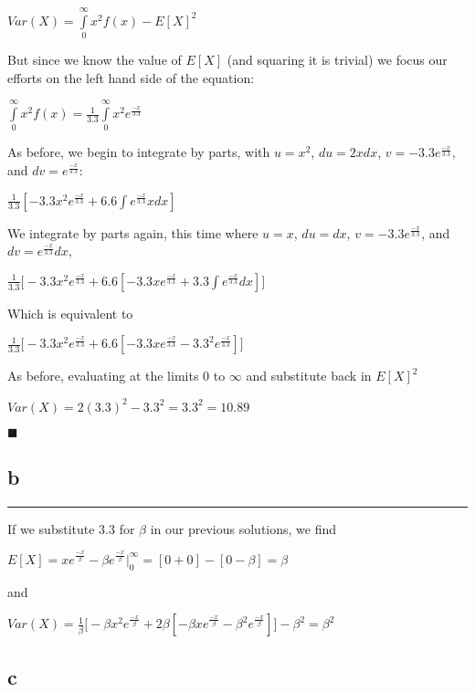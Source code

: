 \documentclass[]{tufte-handout}
\begin{document}
\(Var(X) = \int\limits^\infty_{0}x^2f(x) - E[X]^2\)

But since we know the value of \(E[X]\) (and squaring it is trivial) we
focus our efforts on the left hand side of the equation:

\(\int\limits^\infty_{0}x^2f(x) = \frac{1}{3.3}\int\limits^\infty_{0}x^2e^{\frac{-x}{3.3}}\)

As before, we begin to integrate by parts, with \(u = x^2\),
\(du = 2xdx\), \(v = -3.3e^{\frac{-x}{3.3}}\), and
\(dv = e^{\frac{-x}{3.3}}\):

\(\frac{1}{3.3}[-3.3x^2e^{\frac{-x}{3.3}}+6.6\int e^{\frac{-x}{3.3}}xdx]\)

We integrate by parts again, this time where \(u = x\), \(du = dx\),
\(v = -3.3e^{\frac{-x}{3.3}}\), and \(dv = e^{\frac{-x}{3.3}}dx\),

\(\frac{1}{3.3}\Big[-3.3x^2e^{\frac{-x}{3.3}}+6.6[-3.3xe^{\frac{-x}{3.3}} + 3.3 \int e^{\frac{-x}{3.3}}dx]\Big]\)

Which is equivalent to

\(\frac{1}{3.3}\Big[-3.3x^2e^{\frac{-x}{3.3}}+6.6[-3.3xe^{\frac{-x}{3.3}} - 3.3^2 e^{\frac{-x}{3.3}}]\Big]\)

As before, evaluating at the limits \(0\) to \(\infty\) and substitute
back in \(E[X]^2\)

\(Var(X) = 2(3.3)^2-3.3^2 = 3.3^2 = 10.89\)

\begin{marginfigure}
\(\blacksquare\)
\end{marginfigure}

\hypertarget{b-2}{%
\subsection{b}\label{b-2}}

\begin{center}\rule{0.5\linewidth}{0.5pt}\end{center}

If we substitute \(3.3\) for \(\beta\) in our previous solutions, we
find

\(E[X] = xe^{\frac{-x}{\beta}} - \beta e^{\frac{-x}{\beta}}\Big|^\infty_0 = [0 + 0] - [0 - \beta] = \beta\)

and

\(Var(X) = \frac{1}{\beta}\Big[-\beta x^2e^{\frac{-x}{\beta}}+2\beta[-\beta xe^{\frac{-x}{\beta}} - \beta^2 e^{\frac{-x}{\beta}}]\Big] - \beta^2 = \beta^2\)

\hypertarget{c-1}{%
\subsection{c}\label{c-1}}
\end{document}
